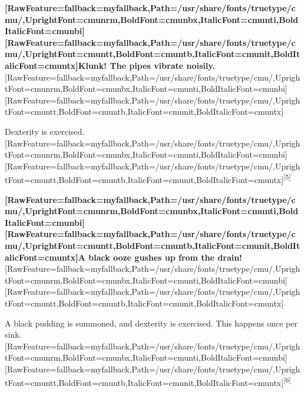 {\bfseries \allowbreak{}\setmainfont{cmunbx.ttf}[RawFeature={fallback=myfallback},Path=/usr/share/fonts/truetype/cmu/,UprightFont=cmunrm,BoldFont=cmunbx,ItalicFont=cmunti,BoldItalicFont=cmunbi]\setmonofont{cmunbx.ttf}[RawFeature={fallback=myfallback},Path=/usr/share/fonts/truetype/cmu/,UprightFont=cmuntt,BoldFont=cmuntb,ItalicFont=cmunit,BoldItalicFont=cmuntx]\bfseries Klunk! The pipes vibrate noisily.}\allowbreak{}\setmainfont{cmunrm.ttf}[RawFeature={fallback=myfallback},Path=/usr/share/fonts/truetype/cmu/,UprightFont=cmunrm,BoldFont=cmunbx,ItalicFont=cmunti,BoldItalicFont=cmunbi]\setmonofont{cmunrm.ttf}[RawFeature={fallback=myfallback},Path=/usr/share/fonts/truetype/cmu/,UprightFont=cmuntt,BoldFont=cmuntb,ItalicFont=cmunit,BoldItalicFont=cmuntx]

\begin{myquote}
\item{}Dexterity\footnotemark[56] is exercised.\allowbreak{}\setmainfont{cmunrm.ttf}[RawFeature={fallback=myfallback},Path=/usr/share/fonts/truetype/cmu/,UprightFont=cmunrm,BoldFont=cmunbx,ItalicFont=cmunti,BoldItalicFont=cmunbi]\setmonofont{cmunrm.ttf}[RawFeature={fallback=myfallback},Path=/usr/share/fonts/truetype/cmu/,UprightFont=cmuntt,BoldFont=cmuntb,ItalicFont=cmunit,BoldItalicFont=cmuntx]\textsuperscript{{$\text{[}$}5{$\text{]}$}}
\end{myquote}

{\bfseries \allowbreak{}\setmainfont{cmunbx.ttf}[RawFeature={fallback=myfallback},Path=/usr/share/fonts/truetype/cmu/,UprightFont=cmunrm,BoldFont=cmunbx,ItalicFont=cmunti,BoldItalicFont=cmunbi]\setmonofont{cmunbx.ttf}[RawFeature={fallback=myfallback},Path=/usr/share/fonts/truetype/cmu/,UprightFont=cmuntt,BoldFont=cmuntb,ItalicFont=cmunit,BoldItalicFont=cmuntx]\bfseries A black ooze gushes up from the drain!}\allowbreak{}\setmainfont{cmunrm.ttf}[RawFeature={fallback=myfallback},Path=/usr/share/fonts/truetype/cmu/,UprightFont=cmunrm,BoldFont=cmunbx,ItalicFont=cmunti,BoldItalicFont=cmunbi]\setmonofont{cmunrm.ttf}[RawFeature={fallback=myfallback},Path=/usr/share/fonts/truetype/cmu/,UprightFont=cmuntt,BoldFont=cmuntb,ItalicFont=cmunit,BoldItalicFont=cmuntx]

\begin{myquote}
\item{}A black pudding\footnotemark[57] is summoned, and dexterity is exercised. This happens once per sink.\allowbreak{}\setmainfont{cmunrm.ttf}[RawFeature={fallback=myfallback},Path=/usr/share/fonts/truetype/cmu/,UprightFont=cmunrm,BoldFont=cmunbx,ItalicFont=cmunti,BoldItalicFont=cmunbi]\setmonofont{cmunrm.ttf}[RawFeature={fallback=myfallback},Path=/usr/share/fonts/truetype/cmu/,UprightFont=cmuntt,BoldFont=cmuntb,ItalicFont=cmunit,BoldItalicFont=cmuntx]\textsuperscript{{$\text{[}$}6{$\text{]}$}}
\end{myquote}

